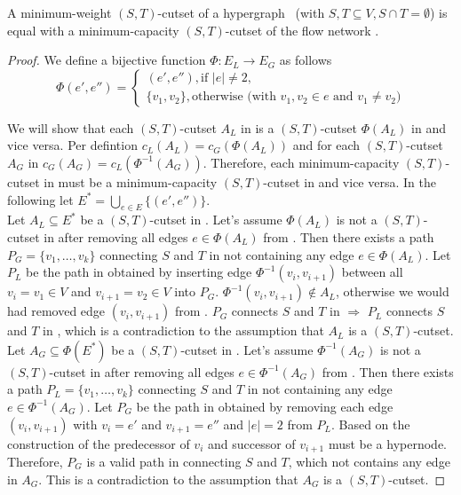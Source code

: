 \begin{theorem}
\label{theorem:st_cutset_equal_graph}
A minimum-weight $(S,T)$-cutset of a hypergraph \HypergraphDef~(with $S,T \subseteq V,
S \cap T = \emptyset$) is equal with a minimum-capacity $(S,T)$-cutset of the
flow network .
\label{theorem:heuer_network}
\end{theorem}

\begin{proof}

We define a bijective function $\Phi: E_L \rightarrow E_G$ as follows
\[ \Phi(e',e'') = 
   \begin{cases}
      (e',e''), \text{if } |e| \neq 2, \\
      \{v_1,v_2\}, \text{otherwise (with $v_1,v_2 \in e$ and $v_1 \neq v_2$)}
   \end{cases} \]

We will show that each $(S,T)$-cutset $A_L$ in  is a $(S,T)$-cutset $\Phi(A_L)$ in
 and vice versa. Per defintion $c_L(A_L) = c_G(\Phi(A_L))$ and for each $(S,T)$-cutset
$A_G$ in  $c_G(A_G) = c_L(\Phi^{-1}(A_G))$. Therefore, each minimum-capacity $(S,T)$-cutset
in  must be a minimum-capacity $(S,T)$-cutset in  and vice versa. In the following 
let $E^* = \bigcup_{e \in E} \{(e',e'')\}$. \\
Let $A_L \subseteq E^*$ be a $(S,T)$-cutset in . Let's assume $\Phi(A_L)$ is not a $(S,T)$-cutset
in  after removing all edges $e \in \Phi(A_L)$ from . Then there exists a path
$P_G = \{v_1,\ldots,v_k\}$ connecting $S$ and $T$ in  not containing any edge $e \in \Phi(A_L)$.
Let $P_L$ be the path in  obtained by inserting edge $\Phi^{-1}(v_i,v_{i+1})$ between all
$v_i = v_1 \in V$ and $v_{i+1} = v_2 \in V$ into $P_G$. $\Phi^{-1}(v_i,v_{i+1}) \notin A_L$, otherwise
we would had removed edge $(v_i,v_{i+1})$ from . $P_G$ connects $S$ and $T$ in  
$\Rightarrow$ $P_L$ connects $S$ and $T$ in , which is a contradiction to the assumption
that $A_L$ is a $(S,T)$-cutset. \\
Let $A_G \subseteq \Phi(E^*)$ be a $(S,T)$-cutset in . Let's assume $\Phi^{-1}(A_G)$ is not
a $(S,T)$-cutset in  after removing all edges $e \in \Phi^{-1}(A_G)$ from . Then
there exists a path $P_L = \{v_1,\ldots,v_k\}$ connecting $S$ and $T$ in  not containing any
edge $e \in \Phi^{-1}(A_G)$. Let $P_G$ be the path in  obtained by removing each edge
$(v_i,v_{i+1})$ with $v_i = e'$ and $v_{i+1} = e''$ and $|e| = 2$ from $P_L$. Based on the construction
of  the predecessor of $v_i$ and successor of $v_{i+1}$ must be a hypernode.
Therefore, $P_G$ is a valid path in  connecting $S$ and $T$, which not contains any edge in 
$A_G$. This is a contradiction to the assumption that $A_G$ is a $(S,T)$-cutset.


\end{proof}
